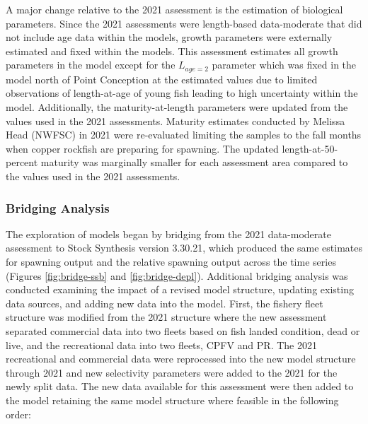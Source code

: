 \documentclass[11pt,
  english,
  letterpaper,
]{article}
\begin{document}
A major change relative to the 2021 assessment is the estimation of biological parameters. Since the 2021 assessments were length-based data-moderate that did not include age data within the models, growth parameters were externally estimated and fixed within the models. This assessment estimates all growth parameters in the model except for the \(L_{age=2}\) parameter which was fixed in the model north of Point Conception at the estimated values due to limited observations of length-at-age of young fish leading to high uncertainty within the model. Additionally, the maturity-at-length parameters were updated from the values used in the 2021 assessments. Maturity estimates conducted by Melissa Head (NWFSC) in 2021 were re-evaluated limiting the samples to the fall months when copper rockfish are preparing for spawning. The updated length-at-50-percent maturity was marginally smaller for each assessment area compared to the values used in the 2021 assessments.

\hypertarget{bridging-analysis}{%
\subsubsection{Bridging Analysis}\label{bridging-analysis}}

The exploration of models began by bridging from the 2021 data-moderate assessment to Stock Synthesis version 3.30.21, which produced the same estimates for spawning output and the relative spawning output across the time series (Figures \ref{fig:bridge-ssb} and \ref{fig:bridge-depl}). Additional bridging analysis was conducted examining the impact of a revised model structure, updating existing data sources, and adding new data into the model. First, the fishery fleet structure was modified from the 2021 structure where the new assessment separated commercial data into two fleets based on fish landed condition, dead or live, and the recreational data into two fleets, CPFV and PR. The 2021 recreational and commercial data were reprocessed into the new model structure through 2021 and new selectivity parameters were added to the 2021 for the newly split data. The new data available for this assessment were then added to the model retaining the same model structure where feasible in the following order:
\end{document}

